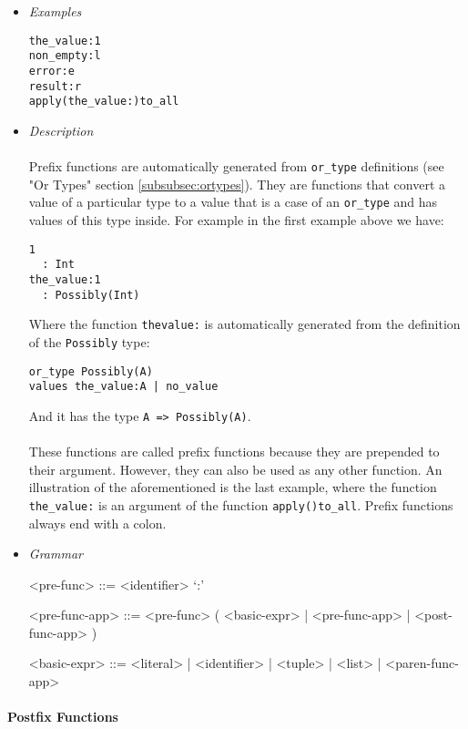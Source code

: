 \documentclass{article}
\begin{document}
\begin{itemize}

\item \textit{Examples}
\begin{verbatim}
the_value:1
non_empty:l
error:e
result:r
apply(the_value:)to_all
\end{verbatim}

\item \textit{Description} \\\\
Prefix functions are automatically generated from \texttt{or_type} definitions
(see "Or Types" section \ref{subsubsec:ortypes}). They are functions that
convert a value of a particular type to a value that is a case of an
\texttt{or_type} and has values of this type inside. For example in the
first example above we have:
\begin{verbatim}
1 
  : Int
the_value:1
  : Possibly(Int)
\end{verbatim}
Where the function \texttt{thevalue:} is automatically generated from the
definition of the \texttt{Possibly} type:
\begin{verbatim}
or_type Possibly(A)
values the_value:A | no_value
\end{verbatim}
And it has the type \texttt{A => Possibly(A)}.
\\\\
These functions are called prefix functions because they are prepended to
their argument. However, they can also be used as any other function.
An illustration of the aforementioned is the last example, where the function
\texttt{the_value:} is an argument of the function \texttt{apply()to_all}.
Prefix functions always end with a colon.

\item \textit{Grammar}
\begin{grammar}
<pre-func> ::= <identifier> `:'

<pre-func-app> ::= <pre-func> ( <basic-expr> | <pre-func-app> | <post-func-app> )

<basic-expr> ::=
<literal> | <identifier> | <tuple> | <list> | <paren-func-app> \\
\end{grammar}

\end{itemize}

\paragraph{Postfix Functions}
\end{document}
